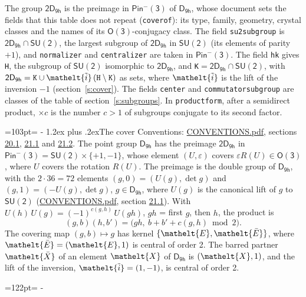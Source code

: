 \documentclass[10pt,a4paper]{article}
\makeatletter
\renewcommand\section{\@startsection{section}{1}{\z@}{-3ex plus -1ex minus -.2ex}%
  {1.2ex plus .2ex}{\normalfont\large\sffamily\bfseries\color{parttitle}}}
\newcommand{\needspace}[1]{\par\penalty-100\begingroup\dimen0=#1\relax\dimen2=\pagegoal
  \advance\dimen2-\pagetotal\ifdim\dimen0>\dimen2\relax\ifdim\dimen2>0pt\vfil\break\fi\fi
  \endgroup}
\numberwithin{equation}{section}
\newcommand{\eltfont}[1]{{\let\sigma\eltsigma\mathelt{#1}}}
\newcommand{\grp}[1]{\mathsf{#1}}
\newcommand{\elt}[1]{\eltfont{#1}}
\newcommand{\dirprod}{\times}
\newcommand{\barred}[1]{\bar{#1}}
\newcommand{\lift}[1]{\tilde{#1}}
\makeatother
\begin{document}
\leavevmode\label{n:element.inversion}\label{n:group.preimage}The group $\grp{2D_{9h}}$ is the preimage in $\grp{Pin^{-}(3)}$ of \href{../../../rotation/data/pdf/D9h.pdf}{$\grp{D_{9h}}$}, whose document sets the fields that this table does not repeat (\texttt{coverof}): its type, family, geometry, crystal classes and the names of its \href{../../../rotation/data/pdf/O3.pdf}{$\grp{O(3)}$}-conjugacy class. The field \texttt{su2subgroup} is $\grp{2D_{9h}} \cap \grp{SU(2)}$, the largest subgroup of $\grp{2D_{9h}}$ in $\grp{SU(2)}$ (its elements of parity $+1$), and \texttt{normalizer} and \texttt{centralizer} are taken in $\grp{Pin^{-}(3)}$. The field \texttt{hk} gives \texttt{H}, the subgroup of $\grp{SU(2)}$ isomorphic to $\grp{2D_{9h}}$, and \texttt{K}${} = \grp{2D_{9h}} \cap \grp{SU(2)}$, with $\grp{2D_{9h}} = \texttt{K} \cup \elt{\lift{i}}\,(\texttt{H} \setminus \texttt{K})$ as sets, where $\elt{\lift{i}}$ is the lift of the inversion $-1$ (section~\ref{s:cover}). The fields \texttt{center} and \texttt{commutatorsubgroup} are classes of the table of section~\ref{s:subgroups}.
\leavevmode\label{n:index.conjugates.c}In \texttt{productform}, after a semidirect product, ${\times}c$ is the number $c > 1$ of subgroups conjugate to its second factor.
\needspace{103pt}
\section{The cover}\label{s:cover}
Conventions: \href{../../CONVENTIONS.pdf}{CONVENTIONS.pdf}, sections \href{../../CONVENTIONS.pdf\#conv.20.1}{20.1}, \href{../../CONVENTIONS.pdf\#conv.21.1}{21.1} and \href{../../CONVENTIONS.pdf\#conv.21.2}{21.2}.
\leavevmode\label{n:group.pin.minus}\label{n:group.su2}\label{n:local.pin.sign}\label{n:matrix.covered}\label{n:matrix.lift.su2}\label{n:index.bar}The point group $\grp{D_{9h}}$ has the preimage $\grp{2D_{9h}}$ in $\grp{Pin^{-}(3)} = \grp{SU(2)} \dirprod \{+1, -1\}$, whose element $(U, \varepsilon)$ covers $\varepsilon R(U) \in \grp{O(3)}$, where $U$ covers the rotation $R(U)$. The preimage is the double group of $\grp{D_{9h}}$, with the $2 \cdot 36 = 72$ elements $(g, 0) = (U(g), \det g)$ and $(g, 1) = (-U(g), \det g)$, $g \in \grp{D_{9h}}$, where $U(g)$ is the canonical lift of $g$ to $\grp{SU(2)}$ (\href{../../CONVENTIONS.pdf}{CONVENTIONS.pdf}, section \href{../../CONVENTIONS.pdf\#conv.21.1}{21.1}). \label{n:function.cocycle}With $U(h)\,U(g) = (-1)^{c(g,h)}\,U(gh)$, $gh$ = first $g$, then $h$, the product is
\begin{equation}\label{e:product}(g, b)(h, b') = \bigl(gh,\ b + b' + c(g, h) \bmod 2\bigr).\end{equation}
\leavevmode\label{n:mark.bar}The covering map $(g, b) \mapsto g$ has kernel $\{\elt{E}, \elt{\barred{E}}\}$, where $\elt{\barred{E}} = (\elt{E}, 1)$ is central of order 2. \label{n:element.named}\label{n:mark.lift}The barred partner $\elt{\barred{X}}$ of an element $\elt{X}$ of $\grp{D_{9h}}$ is $(\elt{X}, 1)$, and the lift of the inversion, $\elt{\lift{i}} = (1, -1)$, is central of order 2.
\needspace{122pt}
\end{document}
